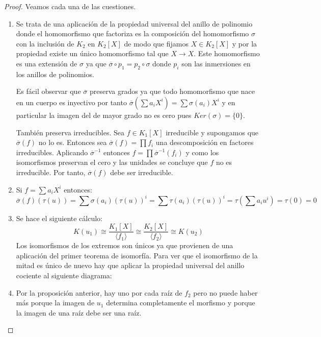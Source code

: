 \begin{proof}
	Veamos cada una de las cuestiones. 
	
	\begin{enumerate}
		\item Se trata de una aplicación de la propiedad universal del anillo de polinomio donde el homomorfismo que factoriza es la composición del homomorfismo $\sigma$ con la inclusión de $K_2$ en $K_2[X]$ de modo que fijamos $X \in K_2[X]$ y por la propiedad existe un único homomorfismo tal que $X \to X$. Este homomorfismo es una extensión de $\sigma$ ya que $\overline{\sigma} \circ p_1 = p_2 \circ \sigma$ donde $p_i$ son las inmersiones en los anillos de polinomios. 
		
		Es fácil observar que $\overline{\sigma}$ preserva grados ya que todo homomorfismo que nace en un cuerpo es inyectivo por tanto $\overline{\sigma}(\sum a_iX^i) = \sum \sigma(a_i)X^i$ y en particular la imagen del de mayor grado no es cero pues $Ker(\sigma) = \{0\}$. 
		
		También preserva irreducibles. Sea $f \in K_1[X]$ irreducible y supongamos que $\overline{\sigma}(f)$ no lo es. Entonces sea $\overline{\sigma}(f) = \prod f_i$ una descomposición en factores irreducibles. Aplicando $\overline{\sigma}^{-1}$ entonces $f = \prod \overline{\sigma}^{-1}(f_i)$ y como los isomorfismos preservan el cero y las unidades se concluye que $f$ no es irreducible. Por tanto, $\overline{\sigma}(f)$ debe ser irreducible. 
		\item Si $f = \sum a_iX^i$ entonces: $$\overline{\sigma}(f)(\tau(u)) = \sum \sigma(a_i)(\tau(u))^i = \sum \tau(a_i)(\tau(u))^i = \tau(\sum a_iu^i) = \tau(0) = 0$$		
		\item Se hace el siguiente cálculo: $$K(u_1) \cong \frac{K_1[X]}{\langle f_1 \rangle} \cong \frac{K_2[X]}{\langle f_2 \rangle} \cong K(u_2)$$ Los isomorfismos de los extremos son únicos ya que provienen de una aplicación del primer teorema de isomorfía. Para ver que el isomorfismo de la mitad es único de nuevo hay que aplicar la propiedad universal del anillo cociente al siguiente diagrama:
		\item Por la proposición anterior, hay uno por cada raíz de $f_2$ pero no puede haber más porque la imagen de $u_1$ determina completamente el morfismo y porque la imagen de una raíz debe ser una raíz. 
	\end{enumerate}
\end{proof}

